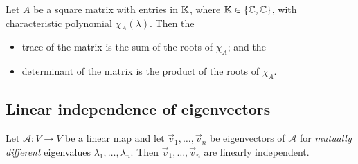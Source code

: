 \begin{theorem}
    Let $A$ be a square matrix with entries in $\mathbb{K}$, where $\mathbb{K} \in \{\mathbb{C}, \mathbb{C}\}$, with characteristic polynomial $\chi_A(\lambda)$. Then the
    \begin{itemize}
        \item trace of the matrix is the sum of the roots of $\chi_A$; and the
        \item determinant of the matrix is the product of the roots of $\chi_A$.
    \end{itemize}
\end{theorem}

\subsection{Linear independence of eigenvectors}
\begin{theorem}
    Let $\mathcal{A}: V \to V$ be a linear map and let $\vec{v}_1, \dots, \vec{v}_n$ be eigenvectors of $\mathcal{A}$ for \emph{mutually different} eigenvalues
    $\lambda_1, \dots, \lambda_n$. Then $\vec{v}_1, \dots, \vec{v}_n$ are linearly independent.
\end{theorem}

